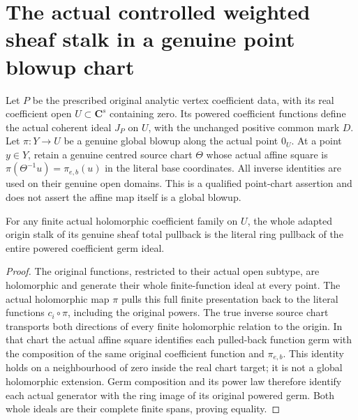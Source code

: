 \section{The actual controlled weighted sheaf stalk in a genuine point blowup chart}

Let $P$ be the prescribed original analytic vertex coefficient data, with its
real coefficient open $U\subset\mathbf C^s$ containing zero. Its powered
coefficient functions define the actual coherent ideal $J_P$ on $U$, with
the unchanged positive common mark $D$. Let $\pi:Y\to U$ be a genuine global
blowup along the actual point $0_U$. At a point $y\in Y$, retain a genuine
centred source chart $\Theta$ whose actual affine square is
$\pi(\Theta^{-1}u)=\pi_{e,b}(u)$ in the literal base coordinates.
All inverse identities are used on their genuine open domains. This is a
qualified point-chart assertion and does not assert the affine map itself
is a global blowup.

\begin{lemma}
\label{hir:actual-point-chart-whole-weighted-total-stalk}
\leanok
For any finite actual holomorphic coefficient family on $U$, the whole
adapted origin stalk of its genuine sheaf total pullback is the literal
ring pullback of the entire powered coefficient germ ideal.
\end{lemma}
\begin{proof}
The original functions, restricted to their actual open subtype, are
holomorphic and generate their whole finite-function ideal at every point.
The actual holomorphic map $\pi$ pulls this full finite presentation back
to the literal functions $c_i\circ\pi$, including the original powers.
The true inverse source chart transports both directions of every finite
holomorphic relation to the origin. In that chart the actual affine square
identifies each pulled-back function germ with the composition of the same
original coefficient function and $\pi_{e,b}$. This identity holds on a
neighbourhood of zero inside the real chart target; it is not a global
holomorphic extension. Germ composition and its power law therefore identify
each actual generator with the ring image of its original powered germ.
Both whole ideals are their complete finite spans, proving equality.
\end{proof}

